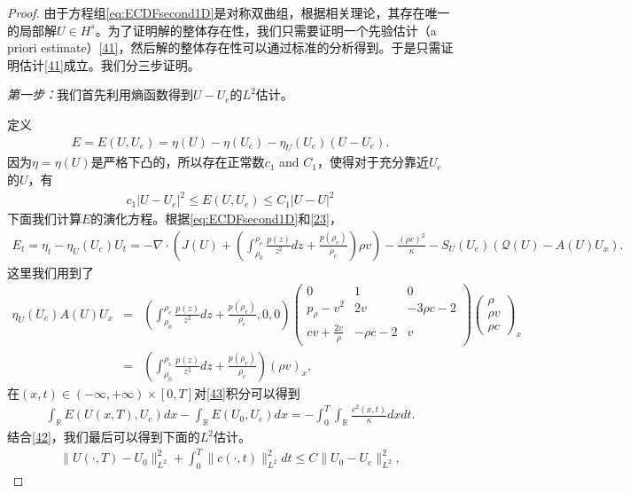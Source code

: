 \begin{proof}
由于方程组\eqref{eq:ECDFsecond1D}是对称双曲组，根据相关理论\cite{majda1984compressible, kato1975cauchy}，其存在唯一的局部解$U \in H^s$。为了证明解的整体存在性，我们只需要证明一个先验估计（a priori estimate）\eqref{41}，然后解的整体存在性可以通过标准的分析得到\cite{yong2004entropy}。于是只需证明估计\eqref{41}成立。我们分三步证明。

\emph{第一步：}我们首先利用熵函数得到$U-U_e$的$L^2$估计。

定义
\begin{eqnarray*}
E=E(U,U_e) = \eta(U)-\eta(U_e)-\eta_U(U_e)(U-U_e).
\end{eqnarray*}
因为$\eta=\eta(U)$是严格下凸的，所以存在正常数$c_1$ and $C_1$，使得对于充分靠近$U_e$的$U$，有
\begin{eqnarray}\label{42}
c_1 |U-U_e|^2 \le E(U,U_e) \le C_1 |U-U|^2
\end{eqnarray}
下面我们计算$E$的演化方程。根据\eqref{eq:ECDFsecond1D}和\eqref{23}，
\begin{eqnarray}\label{43}
E_t = \eta_t - \eta_U(U_e)U_t = -\nabla \cdot \left(J(U) +( \int_{\rho_0}^{\rho_e} \frac{p(z)}{z^2} dz + \frac{p(\rho_e)}{\rho_e})\rho v \right) - \frac{(\rho c)^2}{\kappa} - S_U(U_e)(\mathcal{Q}(U) - A(U)U_x).
\end{eqnarray}
这里我们用到了
\begin{eqnarray*}
\eta_U(U_e) A(U) U_x &=& ( \int_{\rho_0}^{\rho_e} \frac{p(z)}{z^2} dz + \frac{p(\rho_e)}{\rho_e}, 0, 0)
\left( \begin{array}{ccc}
		0 & 1 & 0 \\
		p_\rho - v^2 & 2v & -3 \rho c - 2 \\
		cv + \frac{2 v}{\rho} & -  \rho c - 2 & v 
	\end{array}\right)
\left( \begin{array}{ccc}
\rho \\ \rho v \\ \rho c \end{array} \right)_x \\
&=& \left( \int_{\rho_0}^{\rho_e} \frac{p(z)}{z^2} dz + \frac{p(\rho_e)}{\rho_e}\right) (\rho v )_x,
\end{eqnarray*}
在$(x, t)\in(-\infty, + \infty)\times[0,T]$对\eqref{43}积分可以得到
\begin{eqnarray*}
\int_\mathbb{R}E(U(x, T), U_e)dx - \int_\mathbb{R} E(U_0, U_e)dx = - \int_0^T\int_\mathbb{R} \frac{c^2(x, t)}{\kappa} dx dt.
\end{eqnarray*}
结合\eqref{42}，我们最后可以得到下面的$L^2$估计。
\begin{eqnarray}\label{44}
\|U(\cdot, T)-U_0\|^2_{L^2} + \int_0^T \|c(\cdot, t)\|^2_{L^2}dt \le C\|U_0 - U_e\|^2_{L^2},
\end{eqnarray}


\end{proof}
